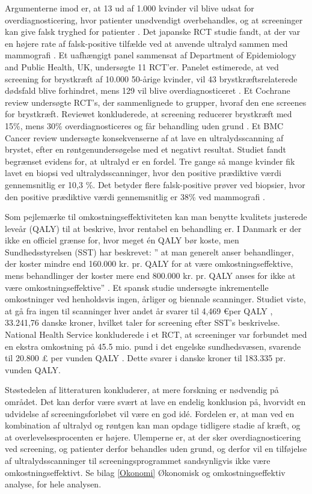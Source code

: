 Argumenterne imod er, at 13 ud af 1.000 kvinder vil blive udsat for overdiagnosticering, hvor patienter unødvendigt overbehandles, og at screeninger kan give falsk tryghed for patienter \cite{Argumenter}. Det japanske RCT studie fandt, at der var en højere rate af falsk-positive tilfælde ved at anvende ultralyd sammen med mammografi \cite{Japan}. Et uafhængigt panel sammensat af Department of Epidemiology and Public Health, UK, undersøgte 11 RCT’er. Panelet estimerede, at ved screening for brystkræft af 10.000 50-årige kvinder, vil 43 brystkræftsrelaterede dødsfald blive forhindret, mens 129 vil blive overdiagnosticeret \cite{Panel}. Et Cochrane review undersøgte RCT’s, der sammenlignede to grupper, hvoraf den ene screenes for brystkræft. Reviewet konkluderede, at screening reducerer brystkræft med 15\%, mens 30\% overdiagnosticeres og får behandling uden grund \cite{Gotzche}. Et BMC Cancer review undersøgte konsekvenserne af at lave en ultralydsscanning af brystet, efter en røntgenundersøgelse med et negativt resultat. Studiet fandt begrænset evidens for, at ultralyd er en fordel. Tre gange så mange kvinder fik lavet en biopsi ved ultralydsscanninger, hvor den positive prædiktive værdi gennemsnitlig er 10,3 \%. Det betyder flere falsk-positive prøver ved biopsier, hvor den positive prædiktive værdi gennemsnitlig er 38\% ved mammografi \cite{DenseBreast}. 

Som pejlemærke til omkostningseffektiviteten kan man benytte kvalitets justerede leveår (QALY) til at beskrive, hvor rentabel en behandling er. I Danmark er der ikke en officiel grænse for, hvor meget én QALY bør koste, men Sundhedsstyrelsen (SST) har beskrevet: ” at man generelt anser behandlinger, der koster mindre end 160.000 kr. pr. QALY for at være omkostningseffektive, mens behandlinger der koster mere end 800.000 kr. pr. QALY anses for ikke at være omkostningseffektive” \cite{QALY}. Et spansk studie undersøgte inkrementelle omkostninger ved henholdsvis ingen, årliger og biennale scanninger. Studiet viste, at gå fra ingen til scanninger hver andet år svarer til 4,469 \euro per QALY \cite{SpanskStudie}, 33.241,76 danske kroner, hvilket taler for screening efter SST's beskrivelse. National Health Service konkluderede i et RCT, at screeninger var forbundet med en ekstra omkostning på 45.5 mio. pund i det engelske sundhedsvæsen, svarende til 20.800 £ per vunden QALY \cite{NHS}. Dette svarer i danske kroner til 183.335 pr. vunden QALY.  

Støstedelen af litteraturen konkluderer, at mere forskning er nødvendig på området. Det kan derfor være svært at lave en endelig konklusion på, hvorvidt en udvidelse af screeningsforløbet vil være en god idé. Fordelen er, at man ved en kombination af ultralyd og røntgen kan man opdage tidligere stadie af kræft, og at overlevelsesprocenten er højere. Ulemperne er, at der sker overdiagnosticering ved screening, og patienter derfor behandles uden grund, og derfor vil en tilføjelse af ultralydsscanninger til screeningsprogrammet sandsynligvis ikke være omkostningseffektivt. Se bilag \ref{Okonomi} Økonomisk og omkostningseffektiv analyse, for hele analysen. 
